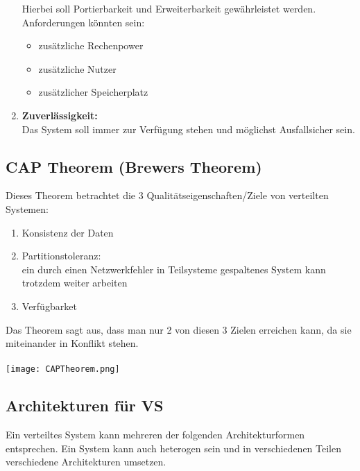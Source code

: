 \begin{enumerate}
            Hierbei soll Portierbarkeit und Erweiterbarkeit gewährleistet werden. Anforderungen könnten sein:
            \begin{itemize}
                  \item zusätzliche Rechenpower
                  \item zusätzliche Nutzer
                  \item zusätzlicher Speicherplatz
            \end{itemize}
      \item \textbf{Zuverlässigkeit:}\\
            Das System soll immer zur Verfügung stehen und möglichst Ausfallsicher sein.
\end{enumerate}

\subsection{CAP Theorem (Brewers Theorem)}
\label{sec:CAP_Theorem}
Dieses Theorem betrachtet die 3 Qualitätseigenschaften/Ziele von verteilten Systemen:
\begin{enumerate}
      \item Konsistenz der Daten
      \item Partitionstoleranz:\\
            ein durch einen Netzwerkfehler in Teilsysteme gespaltenes System kann trotzdem weiter arbeiten
      \item Verfügbarket
\end{enumerate}
Das Theorem sagt aus, dass man nur 2 von diesen 3 Zielen erreichen kann, da sie miteinander in Konflikt stehen.
\\
\\
\texttt{[image: CAPTheorem.png]}

\subsection{Architekturen für VS}
Ein verteiltes System kann mehreren der folgenden Architekturformen entsprechen. Ein System kann auch heterogen sein und in verschiedenen Teilen verschiedene Architekturen umsetzen.

